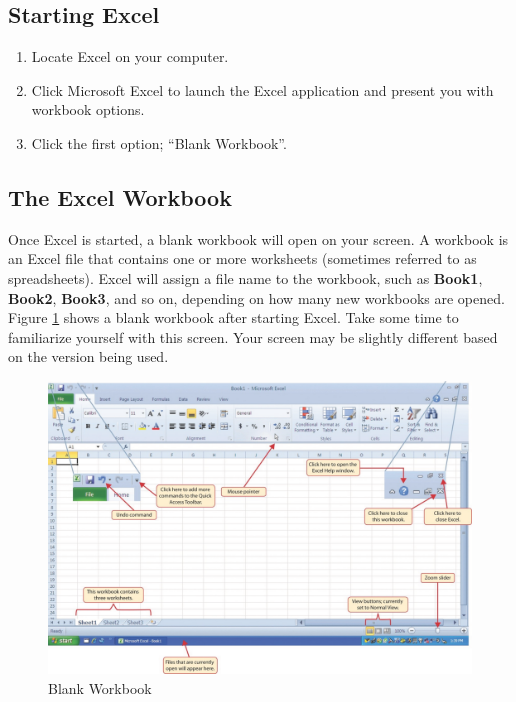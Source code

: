 \subsection{Starting Excel}

\begin{enumerate}
	\item Locate Excel on your computer.
	\item Click Microsoft Excel to launch the Excel application and present you with workbook options.
	\item Click the first option; “Blank Workbook”.
\end{enumerate}

\subsection{The Excel Workbook}

Once Excel is started, a blank workbook will open on your screen. A workbook is an Excel file that contains one or more worksheets (sometimes referred to as spreadsheets). Excel will assign a file name to the workbook, such as \textbf{Book1}, \textbf{Book2}, \textbf{Book3}, and so on, depending on how many new workbooks are opened. Figure \ref{01:fig02} shows a blank workbook after starting Excel. Take some time to familiarize yourself with this screen. Your screen may be slightly different based on the version being used.

\begin{figure}[H]
	\centering
	\includegraphics[width=\maxwidth{.95\linewidth}]{gfx/Ch01_fig02}
	\caption{Blank Workbook}
	\label{01:fig02}
\end{figure}

